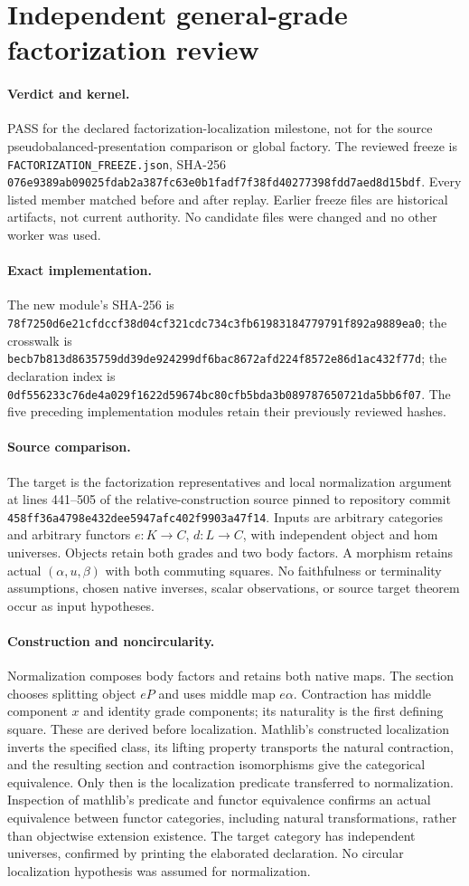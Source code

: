 \documentclass{article}
\begin{document}
\section*{Independent general-grade factorization review}
\paragraph{Verdict and kernel.} PASS for the declared factorization-localization milestone, not for the source pseudobalanced-presentation comparison or global factory. The reviewed freeze is \texttt{FACTORIZATION\_FREEZE.json}, SHA-256 \texttt{076e9389ab09025fdab2a387fc63e0b1fadf7f38fd40277398fdd7aed8d15bdf}. Every listed member matched before and after replay. Earlier freeze files are historical artifacts, not current authority. No candidate files were changed and no other worker was used.
\paragraph{Exact implementation.} The new module's SHA-256 is \texttt{78f7250d6e21cfdccf38d04cf321cdc734c3fb61983184779791f892a9889ea0}; the crosswalk is \texttt{becb7b813d8635759dd39de924299df6bac8672afd224f8572e86d1ac432f77d}; the declaration index is \texttt{0df556233c76de4a029f1622d59674bc80cfb5bda3b089787650721da5bb6f07}. The five preceding implementation modules retain their previously reviewed hashes.
\paragraph{Source comparison.} The target is the factorization representatives and local normalization argument at lines 441--505 of the relative-construction source pinned to repository commit \texttt{458ff36a4798e432dee5947afc402f9903a47f14}. Inputs are arbitrary categories and arbitrary functors $e:K\to C$, $d:L\to C$, with independent object and hom universes. Objects retain both grades and two body factors. A morphism retains actual $(\alpha,u,\beta)$ with both commuting squares. No faithfulness or terminality assumptions, chosen native inverses, scalar observations, or source target theorem occur as input hypotheses.
\paragraph{Construction and noncircularity.} Normalization composes body factors and retains both native maps. The section chooses splitting object $eP$ and uses middle map $e\alpha$. Contraction has middle component $x$ and identity grade components; its naturality is the first defining square. These are derived before localization. Mathlib's constructed localization inverts the specified class, its lifting property transports the natural contraction, and the resulting section and contraction isomorphisms give the categorical equivalence. Only then is the localization predicate transferred to normalization. Inspection of mathlib's predicate and functor equivalence confirms an actual equivalence between functor categories, including natural transformations, rather than objectwise extension existence. The target category has independent universes, confirmed by printing the elaborated declaration. No circular localization hypothesis was assumed for normalization.
\end{document}
